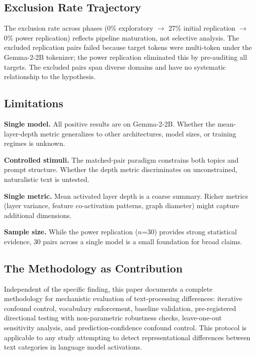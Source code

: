 \documentclass{article}
\begin{document}
\subsection{Exclusion Rate Trajectory}

The exclusion rate across phases (0\% exploratory $\to$ 27\% initial replication $\to$ 0\% 
power replication) reflects pipeline maturation, not selective analysis. The excluded 
replication pairs failed because target tokens were multi-token under the Gemma-2-2B 
tokenizer; the power replication eliminated this by pre-auditing all targets. The excluded 
pairs span diverse domains and have no systematic relationship to the hypothesis.

\subsection{Limitations}

\textbf{Single model.} All positive results are on Gemma-2-2B. Whether the mean-layer-depth 
metric generalizes to other architectures, model sizes, or training regimes is unknown.

\textbf{Controlled stimuli.} The matched-pair paradigm constrains both topics and prompt 
structure. Whether the depth metric discriminates on unconstrained, naturalistic text is 
untested.

\textbf{Single metric.} Mean activated layer depth is a coarse summary. Richer metrics 
(layer variance, feature co-activation patterns, graph diameter) might capture additional 
dimensions.

\textbf{Sample size.} While the power replication ($n$=30) provides strong statistical 
evidence, 30 pairs across a single model is a small foundation for broad claims.

\subsection{The Methodology as Contribution}

Independent of the specific finding, this paper documents a complete methodology for 
mechanistic evaluation of text-processing differences: iterative confound control, vocabulary 
enforcement, baseline validation, pre-registered directional testing with non-parametric 
robustness checks, leave-one-out sensitivity analysis, and prediction-confidence confound 
control. This protocol is applicable to any study attempting to detect representational 
differences between text categories in language model activations.
\end{document}
